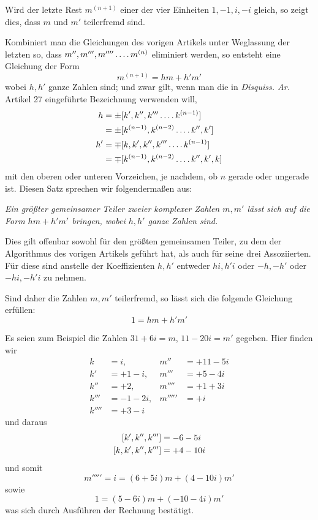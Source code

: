 Wird der letzte Rest $m^{(n+1)}$ einer der vier Einheiten $1,-1,i,-i$ gleich, so zeigt dies, dass $m$ und $m'$ teilerfremd sind.

Kombiniert man die Gleichungen des vorigen Artikels unter Weglassung der letzten so, dass $m'',\allowbreak m''',\allowbreak m''''\mathinner{.\,.\,.\,.}\allowbreak m^{(n)}$ eliminiert werden, so entsteht eine Gleichung der Form
\[
m^{(n+1)}=hm+h'm'
\]
%
wobei $h,h'$ ganze Zahlen sind; und zwar gilt, wenn man die in \emph{Disquiss. Ar.} Artikel 27 eingeführte Bezeichnung verwenden will,
\[
\begin{aligned}
h&=\pm[k',k'',k'''\mathinner{.\,.\,.\,.} k^{(n-1)}]\\
&=\pm[k^{(n-1)},k^{(n-2)}\mathinner{.\,.\,.\,.} k'',k']\\
h'&=\mp[k,k',k'',k'''\mathinner{.\,.\,.\,.} k^{(n-1)}]\\
&=\mp[k^{(n-1)},k^{(n-2)}\mathinner{.\,.\,.\,.} k'',k',k]
\end{aligned}
\]
mit den oberen oder unteren Vorzeichen, je nachdem, ob $n$ gerade oder ungerade ist. Diesen Satz sprechen wir folgendermaßen aus:

\emph{Ein größter gemeinsamer Teiler zweier komplexer Zahlen $m,m'$ lässt sich auf die Form $hm+h'm'$ bringen, wobei $h,h'$ ganze Zahlen sind.}

Dies gilt offenbar sowohl für den größten gemeinsamen Teiler, zu dem der Algorithmus des vorigen Artikels geführt hat, als auch für seine drei Assoziierten. Für diese sind anstelle der Koeffizienten $h,h'$ entweder $hi,h'i$ oder $-h,-h'$ oder $-hi,-h'i$ zu nehmen.

Sind daher die Zahlen $m,m'$ teilerfremd, so lässt sich die folgende Gleichung erfüllen:
\[
1=hm+h'm'
\]

Es seien zum Beispiel die Zahlen $31+6i=m$, $11-20i=m'$ gegeben. Hier finden wir
\[
\begin{aligned}
k&=i,&m''&=+11-5i\\
k'&=+1-i,&m'''&=+5-4i\\
k''&=+2,&m''''&=+1+3i\\
k'''&=-1-2i,&m'''''&=+i\\
k''''&=+3-i
\end{aligned}
\]
und daraus
\[
\begin{aligned}
\relax[k',k'',k''']&=-6-5i\\
[k,k',k'',k''']&=+4-10i
\end{aligned}
\]
und somit
\[
m'''''=i=(6+5i)m+(4-10i)m'
\]
sowie
\[
1=(5-6i)m+(-10-4i)m'
\]
was sich durch Ausführen der Rechnung bestätigt.


